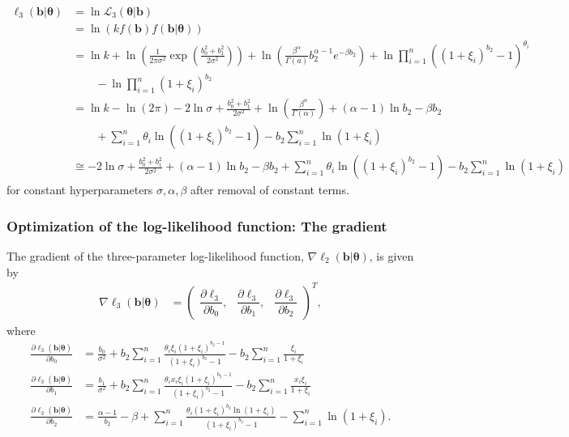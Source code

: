 \documentclass[11pt, letterpaper]{article}
\newcommand{\mc}[1]{\mathcal{#1}}
\begin{document}
\begin{align*}
\ell_3(\bm b | \bm \theta) &= \ln \mc L_3(\bm \theta | \bm b) \\
&= \ln( kf(\bm b)f(\bm b | \bm \theta)) \\
&=\ln k + \ln \left(\frac{1}{2\pi \sigma^2} \exp \left(\frac{b_0^2 + b_1^2}{2\sigma^2} \right) \right) + \ln \left(\frac{\beta^\alpha}{\Gamma(a)} b_2^{\alpha-1}e^{-\beta b_2}\right) + \ln\prod_{i=1}^n \left( (1+\xi_i)^{b_2}-1 \right)^{\theta_i} \\
&\qquad - \ln \prod_{i=1}^n (1+\xi_i)^{b_2} \\
&= \ln k - \ln(2\pi) - 2 \ln \sigma + \frac{b_0^2 + b_1^2}{2\sigma^2} + \ln \left( \frac{\beta^\alpha}{\Gamma(\alpha)} \right) + (\alpha-1)\ln b_2 -\beta b_2 \\
&\qquad + \sum_{i=1}^n \theta_i \ln \left((1+\xi_i)^{b_2}-1\right) - b_2\sum_{i=1}^n  \ln (1+\xi_i) \\
&\cong - 2 \ln \sigma + \frac{b_0^2 + b_1^2}{2\sigma^2} + (\alpha-1)\ln b_2 -\beta b_2  + \sum_{i=1}^n \theta_i \ln \left((1+\xi_i)^{b_2}-1\right) - b_2\sum_{i=1}^n  \ln (1+\xi_i)
\end{align*}
for constant hyperparameters $\sigma, \alpha, \beta$ after removal of constant terms.

\subsubsection{Optimization of the log-likelihood function: The gradient}
The gradient of the three-parameter log-likelihood function, $\nabla \ell_2(\bm b | \bm \theta)$, is given by
\begin{align*}
\nabla \ell_3(\bm b | \bm \theta) &= \begin{pmatrix}
\dfrac{\partial \ell_3}{\partial b_0},   & \dfrac{\partial \ell_3}{\partial b_1} , & \dfrac{\partial \ell_3}{\partial b_2} 
\end{pmatrix}^T,
\end{align*}
where 
\begin{align*}
\frac{\partial \ell_3 (\bm b | \bm \theta)}{\partial b_0}   &= \frac{b_0}{\sigma^2} + b_2 \sum_{i=1}^n \frac{\theta_i \xi_i\left(1+\xi_i \right)^{b_2-1}}{(1+\xi_i)^{b_2} - 1} - b_2 \sum_{i=1}^n \frac{\xi_i}{1+ \xi_i} \\
\frac{\partial \ell_3 (\bm b | \bm \theta)}{\partial b_1}   &= \frac{b_1}{\sigma^2} + b_2 \sum_{i=1}^n \frac{\theta_i x_i \xi_i\left(1+ \xi_i\right)^{b_2-1}}{(1+\xi_i)^{b_2} - 1} - b_2 \sum_{i=1}^n \frac{x_i \xi_i}{1+\xi_i} \\
\frac{\partial \ell_3 (\bm b | \bm \theta)}{\partial b_2}   &= \frac{\alpha -1}{b_2} - \beta + \sum_{i=1}^n \frac{\theta_i (1+\xi_i)^{b_2}\ln(1+\xi_i)}{(1+\xi_i)^{b_2}-1}  -\sum_{i=1}^n  \ln (1+\xi_i).
\end{align*}
\end{document}
